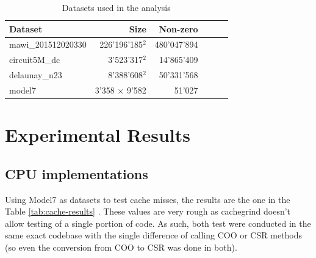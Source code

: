 \documentclass[conference]{IEEEtran}
\begin{document}
\begin{table}[]
	\centering
	\begin{adjustbox}{width=0.9\columnwidth}
		\begin{tabular}{lrrrrc}
			\toprule
			\textbf{Dataset} & \textbf{Size} & \textbf{Non-zero} \\
			\midrule
			mawi\_201512020330 & 226'196'185$^2$ & 480'047'894\\
			circuit5M\_dc & 3'523'317$^2$ & 14'865'409\\
			delaunay\_n23 & 8'388'608$^2$ & 50'331'568\\
			model7  & 3'358 $\times$ 9'582 & 51'027\\
			\bottomrule
		\end{tabular}
	\end{adjustbox}
	\vspace{1em}

	\caption{Datasets used in the analysis}
	\label{tab:dataset}
\end{table}


\clearpage
\FloatBarrier

\section{Experimental Results}

\subsection{CPU implementations}
Using Model7 as datasets to test cache misses, the results are the one in the Table \ref{tab:cache-results} . These values are very rough as cachegrind doesn't allow testing of a single portion of code. As such, both test were conducted in the same exact codebase with the single difference of calling COO or CSR methods (so even the conversion from COO to CSR was done in both).
\end{document}
